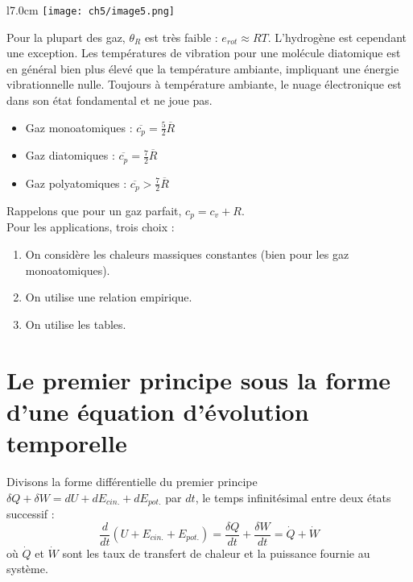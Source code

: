 \begin{wrapfigure}[12]{l}{7.0cm}
	\vspace{-5mm}
	\texttt{[image: ch5/image5.png]}
\end{wrapfigure}
Pour la plupart des gaz, $\theta_R$ est très faible : $e_{rot}\approx RT$. 
L'hydrogène est cependant une exception. Les températures de vibration 
pour une molécule diatomique est en général bien plus élevé que la 
température ambiante, impliquant une énergie vibrationnelle nulle. 
Toujours à température ambiante, le nuage électronique est dans son 
état fondamental et ne joue pas.
\begin{itemize}
\item Gaz monoatomiques : $\overline{c_p} = \frac{5}{2}\overline{R}$
\item Gaz diatomiques : $\overline{c_p} = \frac{7}{2}\overline{R}$
\item Gaz polyatomiques : $\overline{c_p} > \frac{7}{2}\overline{R}$
\end{itemize}
Rappelons que pour un gaz parfait, $c_p=c_v+R$.\\

Pour les applications, trois choix :
\begin{enumerate}
\item On considère les chaleurs massiques constantes (bien pour les gaz 
monoatomiques).
\item On utilise une relation empirique.
\item On utilise les tables.
\end{enumerate}

\section{Le premier principe sous la forme d'une équation d'évolution 
temporelle}
Divisons la forme différentielle du premier principe $\delta Q + \delta 
W = dU + dE_{cin.} + dE_{pot.}$ par $dt$, le temps infinitésimal entre 
deux états successif :
\begin{equation}
\frac{d}{dt}\left(U + E_{cin.} + E_{pot.}\right) = \frac{\delta Q}{dt} 
+\frac{\delta W}{dt} = \dot{Q}+\dot{W}
\end{equation}
où $\dot{Q}$ et $\dot{W}$ sont les taux de transfert de chaleur et la 
puissance fournie au système.

